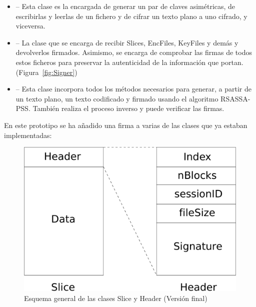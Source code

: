 \begin{itemize}
  \item {} -- Esta clase es la encargada de generar un par de
  claves asimétricas, de escribirlas y leerlas de un fichero y de cifrar
  un texto plano a uno cifrado, y viceversa.

  \item {} -- La clase que se encarga de recibir Slices, EncFiles,
  KeyFiles y demás y devolverlos firmados. Asimismo, se encarga de comprobar
  las firmas de todos estos ficheros para preservar la autenticidad de la
  información que portan. (Figura~\ref{fig:Signer})

  \item {} -- Esta clase incorpora todos los métodos necesarios
  para generar, a partir de un texto plano, un texto codificado y firmado
  usando el algoritmo RSASSA-PSS. También realiza el proceso inverso y puede
  verificar las firmas.
\end{itemize}



En este prototipo se ha añadido una firma a varias de las clases que ya estaban
implementadas:

\begin{figure}[ht]
  \centering
  \includegraphics[scale=0.4]{Figures/Slice_Header_2}
  \decoRule
  \caption[Slice - Header (Versión final)]{Esquema general de las clases Slice y Header (Versión final)}
  \label{fig:Slice_Header_2}
\end{figure}

